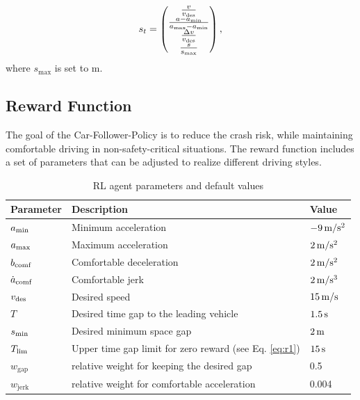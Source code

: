 \documentclass[review]{elsarticle}
\providecommand{\sub}[1]{_{\mathrm{#1}}}  %
\providecommand{\3}{{\ss}}
\begin{document}
\begin{equation}
s_t = 
\begin{pmatrix} 
\frac{v}{v\sub{des}} \\ 
\frac{a-a\sub{\rm min}}{a\sub{\rm max} - a\sub{\rm min}}\\
\frac{\Delta v}{v\sub{des}}\\
\frac{s}{s\sub{\rm max}}

\end{pmatrix},
\end{equation}
%
where $s\sub{max}$ is set to  \unit[200]{m}.

\subsection{Reward Function}
\label{rewardFunction}
The goal of the Car-Follower-Policy is to reduce the crash risk, while
maintaining comfortable driving in non-safety-critical situations. The
reward function includes a set of parameters that can be
adjusted to realize different driving styles. 

\begin{table}
	\caption{RL agent parameters and default values} 
	\label{tab:agentParameters} 
	\begin{center}
		\begin{tabular}{ p{}| p{}| p{}}
			Parameter & Description & Value \\ \hline
			$a\sub{\rm min}$ & Minimum acceleration & $\unit[-9]{m/s^2}$ \\  
			$a_{\rm max}$ & Maximum acceleration & $\unit[2]{m/s^2}$ \\  
			$b_{\rm comf}$ & Comfortable deceleration & $\unit[2]{m/s^2}$ \\  
			$\dot{a}_{\rm comf}$ & Comfortable jerk & $\unit[2]{m/s^3}$ \\  
			$v_{\rm des}$ & Desired speed & $\unit[15]{ m/s}$ \\  		
			$T$ & Desired time gap to the leading vehicle & $\unit[1.5]{s}$ \\
			$s_{\rm min}$ & Desired minimum space gap & $\unit[2]{m}$ \\
			$T_{\rm lim}$ & Upper time gap limit for zero reward (see
			Eq. \eqref{eq:r1}) & $\unit[15]{s}$ \\
			$w\sub{gap}$ & relative weight for keeping the desired gap & 0.5\\
			$w\sub{jerk}$ & relative weight for comfortable acceleration & 0.004\\
		\end{tabular}
	\end{center}
\end{table}
\end{document}
